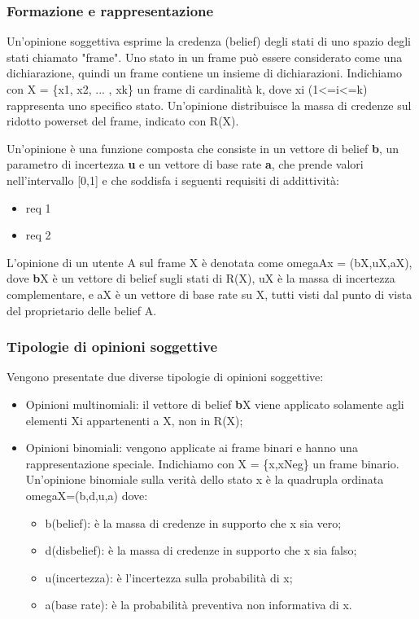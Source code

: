 \documentclass{report}
\begin{document}
	\hypertarget{header-n50}{%
		\subsubsection{Formazione e rappresentazione}\label{header-n50}}
	
	Un'opinione soggettiva esprime la credenza (belief) degli stati di uno
	spazio degli stati chiamato "frame". Uno stato in un frame può essere
	considerato come una dichiarazione, quindi un frame contiene un insieme
	di dichiarazioni. Indichiamo con X = \{x1, x2, ... , xk\} un frame di
	cardinalità k, dove xi (1\textless{}=i\textless{}=k) rappresenta uno
	specifico stato. Un'opinione distribuisce la massa di credenze sul
	ridotto powerset del frame, indicato con R(X).
	
	Un'opinione è una funzione composta che consiste in un vettore di belief
	\textbf{b}, un parametro di incertezza \textbf{u} e un vettore di base
	rate \textbf{a}, che prende valori nell'intervallo {[}0,1{]} e che
	soddisfa i seguenti requisiti di addittività:
	
	\begin{itemize}
		\item
		req 1
		\item
		req 2
	\end{itemize}
	
	L'opinione di un utente A sul frame X è denotata come omegaAx =
	(bX,uX,aX), dove \textbf{b}X è un vettore di belief sugli stati di R(X),
	uX è la massa di incertezza complementare, e aX è un vettore di base
	rate su X, tutti visti dal punto di vista del proprietario delle belief
	A.
	
	\hypertarget{header-n64}{%
		\subsubsection{Tipologie di opinioni soggettive}\label{header-n64}}
	
	Vengono presentate due diverse tipologie di opinioni soggettive:
	
	\begin{itemize}
		\item
		Opinioni multinomiali: il vettore di belief \textbf{b}X viene
		applicato solamente agli elementi Xi appartenenti a X, non in R(X);
		\item
		Opinioni binomiali: vengono applicate ai frame binari e hanno una
		rappresentazione speciale. Indichiamo con X = \{x,xNeg\} un frame
		binario. Un'opinione binomiale sulla verità dello stato x è la
		quadrupla ordinata omegaX=(b,d,u,a) dove:
		
		\begin{itemize}
			\item
			b(belief): è la massa di credenze in supporto che x sia vero;
			\item
			d(disbelief): è la massa di credenze in supporto che x sia falso;
			\item
			u(incertezza): è l'incertezza sulla probabilità di x;
			\item
			a(base rate): è la probabilità preventiva non informativa di x.
		\end{itemize}
	\end{itemize}
	
\end{document}
